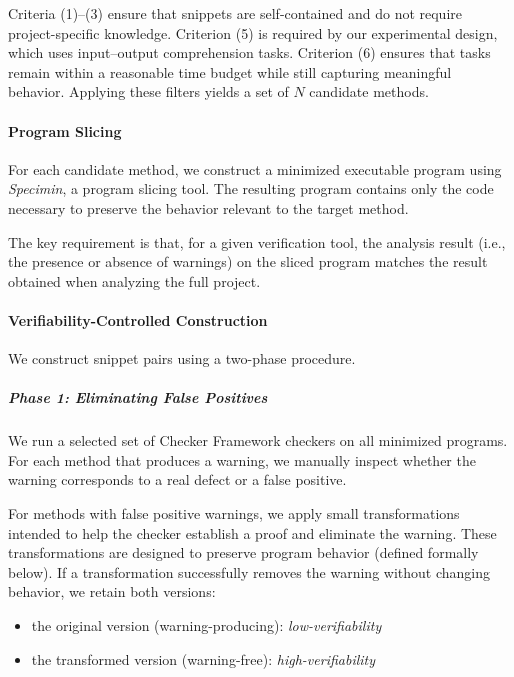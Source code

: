 Criteria (1)--(3) ensure that snippets are self-contained and do not require project-specific knowledge. Criterion (5) is required by our experimental design, which uses input--output comprehension tasks. Criterion (6) ensures that tasks remain within a reasonable time budget while still capturing meaningful behavior. Applying these filters yields a set of $N$ candidate methods.

\paragraph{Program Slicing}
For each candidate method, we construct a minimized executable program using \emph{Specimin}, a program slicing tool. The resulting program contains only the code necessary to preserve the behavior relevant to the target method.

The key requirement is that, for a given verification tool, the analysis result (i.e., the presence or absence of warnings) on the sliced program matches the result obtained when analyzing the full project.

\paragraph{Verifiability-Controlled Construction}
We construct snippet pairs using a two-phase procedure.

\subparagraph{Phase 1: Eliminating False Positives}
We run a selected set of Checker Framework checkers on all minimized programs. For each method that produces a warning, we manually inspect whether the warning corresponds to a real defect or a false positive.

For methods with false positive warnings, we apply small transformations intended to help the checker establish a proof and eliminate the warning. These transformations are designed to preserve program behavior (defined formally below). If a transformation successfully removes the warning without changing behavior, we retain both versions:
\begin{itemize}
    \item the original version (warning-producing): \emph{low-verifiability}
    \item the transformed version (warning-free): \emph{high-verifiability}
\end{itemize}

